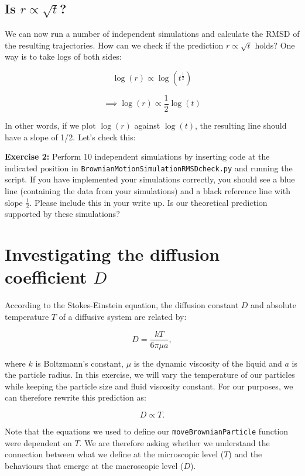\documentclass[11pt, oneside]{article}
\begin{document}
	\subsection{Is $r \propto \sqrt{t}$?}
	
	We can now run a number of independent simulations and calculate the RMSD of the resulting trajectories. How can we check if the prediction $r \propto \sqrt{t}$ holds? One way is to take logs of both sides:
	
	$$\log(r) \propto \log(t^{\frac{1}{2}})$$
	
	$$\implies \log(r) \propto \frac{1}{2}\log(t)$$
	
	\noindent
	In other words, if we plot $\log(r)$ against $\log(t)$, the resulting line should have a slope of 1/2. Let's check this:
	
	\bigskip
	
	\textbf{Exercise 2:} Perform 10 independent simulations by inserting code at the indicated position in \texttt{BrownianMotionSimulationRMSDcheck.py} and running the script. If you have implemented your simulations correctly, you should see a blue line (containing the data from your simulations) and a black reference line with slope $\frac{1}{2}$. Please include this in your write up. Is our theoretical prediction supported by these simulations?
	
	\bigskip
	
	\section{Investigating the diffusion coefficient $D$}
	
	According to the Stokes-Einstein equation, the diffusion constant $D$ and absolute temperature $T$ of a diffusive system are related by:
	
	\begin{equation}
		D = \frac{kT}{6\pi\mu a},
	\end{equation}
	
	\noindent
	where $k$ is Boltzmann's constant, $\mu$ is the dynamic viscosity of the liquid and $a$ is the particle radius. In this exercise, we will vary the temperature of our particles while keeping the particle size and fluid viscosity constant. For our purposes, we can therefore rewrite this prediction as:
	
	\begin{equation}
		D \propto T.
	\end{equation}
	
	\noindent
	Note that the equations we used to define our \texttt{moveBrownianParticle} function were dependent on $T$. We are therefore asking whether we understand the connection between what we define at the microscopic level ($T$) and the behaviours that emerge at the macroscopic level ($D$).
	
\end{document}

